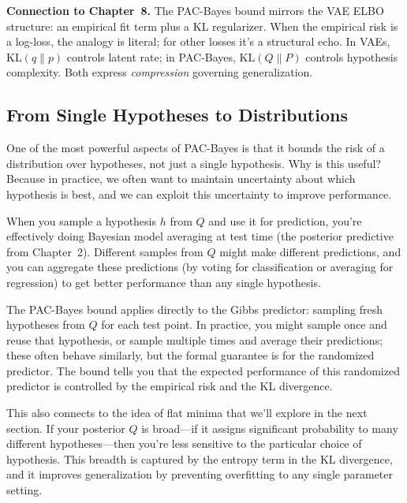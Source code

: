 \vspace{1.5em}



\vspace{0.3cm}
\textbf{Connection to Chapter~8.} The PAC\mbox{-}Bayes bound mirrors the VAE ELBO structure: an empirical fit term plus a KL regularizer. When the empirical risk is a log-loss, the analogy is literal; for other losses it's a structural echo. In VAEs, $\mathrm{KL}(q\|p)$ controls latent rate; in PAC\mbox{-}Bayes, $\mathrm{KL}(Q\|P)$ controls hypothesis complexity. Both express \emph{compression} governing generalization.
\subsection{From Single Hypotheses to Distributions}

One of the most powerful aspects of PAC-Bayes is that it bounds the risk of a distribution over hypotheses, not just a single hypothesis. Why is this useful? Because in practice, we often want to maintain uncertainty about which hypothesis is best, and we can exploit this uncertainty to improve performance.

\vspace{0.3cm}

When you sample a hypothesis $h$ from $Q$ and use it for prediction, you're effectively doing Bayesian model averaging at test time (the posterior predictive from Chapter~2). Different samples from $Q$ might make different predictions, and you can aggregate these predictions (by voting for classification or averaging for regression) to get better performance than any single hypothesis.

\vspace{0.3cm}

The PAC-Bayes bound applies directly to the Gibbs predictor: sampling fresh hypotheses from $Q$ for each test point. In practice, you might sample once and reuse that hypothesis, or sample multiple times and average their predictions; these often behave similarly, but the formal guarantee is for the randomized predictor. The bound tells you that the expected performance of this randomized predictor is controlled by the empirical risk and the KL divergence.

\vspace{0.3cm}

This also connects to the idea of flat minima that we'll explore in the next section. If your posterior $Q$ is broad---if it assigns significant probability to many different hypotheses---then you're less sensitive to the particular choice of hypothesis. This breadth is captured by the entropy term in the KL divergence, and it improves generalization by preventing overfitting to any single parameter setting.

